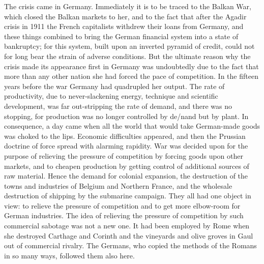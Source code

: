 \documentclass{book}
\begin{document}
The crisis came in Germany. Immediately it is to be traced to the Balkan War, which closed the Balkan markets to her, and to the fact that after the Agadir crisis in 1911 the French capitalists withdrew their loans from Germany, and these things combined to bring the German financial system into a state of bankruptcy; for this system, built upon an inverted pyramid of credit, could not for long bear the strain of adverse conditions. But the ultimate reason why the crisis made its appearance first in Germany was undoubtedly due to the fact that more than any other nation she had forced the pace of competition. In the fifteen years before the war Germany had quadrupled her output. The rate of productivity, due to never-slackening energy, technique and scientific development, was far out-stripping the rate of demand, and there was no stopping, for production was no longer controlled by de/nand but by plant. In consequence, a day came when all the world that would take German-made goods was choked to the lips. Economic difficulties appeared, and then the Prussian doctrine of force spread with alarming rapidity. War was decided upon for the purpose of relieving the pressure of competition by forcing goods upon other markets, and to cheapen production by getting control of additional sources of raw material. Hence the demand for colonial expansion, the destruction of the towns and industries of Belgium and Northern France, and the wholesale destruction of shipping by the submarine campaign. They all had one object in view: to relieve the pressure of competition and to get more elbow-room for German industries. The idea of relieving the pressure of competition by such commercial sabotage was not a new one. It had been employed by Rome when she destroyed Carthage and Corinth and the vineyards and olive groves in Gaul out of commercial rivalry. The Germans, who copied the methods of the Romans in so many ways, followed them also here.
\end{document}
